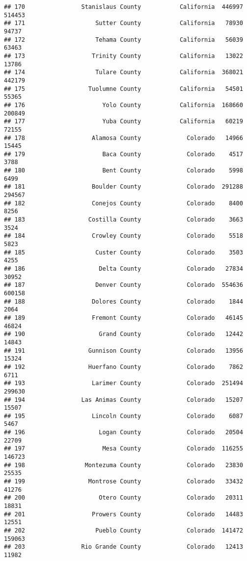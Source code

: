 \documentclass[
]{article}
\begin{document}
\begin{verbatim}
## 170                Stanislaus County           California  446997  514453
## 171                    Sutter County           California   78930   94737
## 172                    Tehama County           California   56039   63463
## 173                   Trinity County           California   13022   13786
## 174                    Tulare County           California  368021  442179
## 175                  Tuolumne County           California   54501   55365
## 176                      Yolo County           California  168660  200849
## 177                      Yuba County           California   60219   72155
## 178                   Alamosa County             Colorado   14966   15445
## 179                      Baca County             Colorado    4517    3788
## 180                      Bent County             Colorado    5998    6499
## 181                   Boulder County             Colorado  291288  294567
## 182                   Conejos County             Colorado    8400    8256
## 183                  Costilla County             Colorado    3663    3524
## 184                   Crowley County             Colorado    5518    5823
## 185                    Custer County             Colorado    3503    4255
## 186                     Delta County             Colorado   27834   30952
## 187                    Denver County             Colorado  554636  600158
## 188                   Dolores County             Colorado    1844    2064
## 189                   Fremont County             Colorado   46145   46824
## 190                     Grand County             Colorado   12442   14843
## 191                  Gunnison County             Colorado   13956   15324
## 192                  Huerfano County             Colorado    7862    6711
## 193                   Larimer County             Colorado  251494  299630
## 194                Las Animas County             Colorado   15207   15507
## 195                   Lincoln County             Colorado    6087    5467
## 196                     Logan County             Colorado   20504   22709
## 197                      Mesa County             Colorado  116255  146723
## 198                 Montezuma County             Colorado   23830   25535
## 199                  Montrose County             Colorado   33432   41276
## 200                     Otero County             Colorado   20311   18831
## 201                   Prowers County             Colorado   14483   12551
## 202                    Pueblo County             Colorado  141472  159063
## 203                Rio Grande County             Colorado   12413   11982

\end{verbatim}
\end{document}
